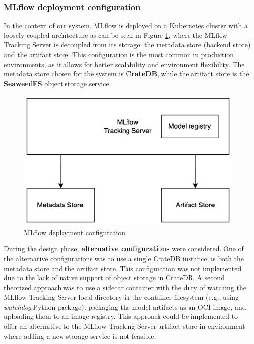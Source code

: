 

\subsubsection{MLflow deployment configuration}

In the context of our system, MLflow is deployed on a Kubernetes cluster with a loosely coupled architecture as can be seen in Figure \ref{fig:mlflow_config}, where the MLflow Tracking Server is decoupled from its storage: the metadata store (backend store) and the artifact store.
This configuration is the most common in production environments, as it allows for better scalability and environment flexibility.
The metadata store chosen for the system is \textbf{CrateDB}, while the artifact store is the \textbf{SeaweedFS} object storage service. \\

\begin{figure}[htb]
  \centering
  \includegraphics[width=0.50\linewidth]{images/mlflow_config.png}
  \caption{MLflow deployment configuration}
  \label{fig:mlflow_config}
\end{figure}

During the design phase, \textbf{alternative configurations} were considered.
One of the alternative configurations was to use a single CrateDB instance as both the metadata store and the artifact store. This configuration was not implemented due to the lack of native support of object storage in CrateDB.
A second theorized approach was to use a sidecar container with the duty of watching the MLflow Tracking Server local directory in the container filesystem (e.g., using \textit{watchdog} Python package), packaging the model artifacts as an OCI image, and uploading them to an image registry. This approach could be implemented to offer an alternative to the MLflow Tracking Server artifact store in environment where adding a new storage service is not feasible.



